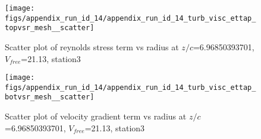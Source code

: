\begin{figure}[H]
\centering
\texttt{[image: figs/appendix\_run\_id\_14/appendix\_run\_id\_14\_turb\_visc\_ettap\_topvsr\_mesh\_\_scatter]}
\caption{Scatter plot of reynolds stress term vs radius at $z/c$=6.96850393701, $V_{free}$=21.13, station3}
\label{fig:appendix_run_id_14_turb_visc_ettap_topvsr_mesh__scatter}
\end{figure}


\begin{figure}[H]
\centering
\texttt{[image: figs/appendix\_run\_id\_14/appendix\_run\_id\_14\_turb\_visc\_ettap\_botvsr\_mesh\_\_scatter]}
\caption{Scatter plot of velocity gradient term vs radius at $z/c$=6.96850393701, $V_{free}$=21.13, station3}
\label{fig:appendix_run_id_14_turb_visc_ettap_botvsr_mesh__scatter}
\end{figure}


